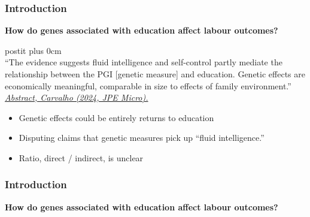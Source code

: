 \documentclass[dvipsnames,handout]{beamer} %
\renewcommand{\raggedright}{\leftskip=0pt \rightskip=0pt plus 0cm}
\begin{document}
\begin{frame}[noframenumbering]
    \frametitle{Introduction}
    \textbf{How do genes associated with education affect labour outcomes?}
    \vspace{0.25cm}
    
    \begin{beamercolorbox}{postit}
        \raggedright
        \vspace{0.01cm} \\
        ``The evidence suggests fluid intelligence and self-control partly mediate the relationship between the PGI [genetic measure] and education.
        Genetic effects are economically meaningful, comparable in size to effects of family environment.''
        \hfill
        \underline{\textit{Abstract, Carvalho (2024, JPE Micro).}}
        \vspace{0.02cm}
    \end{beamercolorbox}

    \vspace{-0.25cm}
    \begin{figure}
        \centering
        \singlespacing
    \end{figure}
    \vspace{-0.25cm}
    \begin{itemize}
        \item Genetic effects could be entirely returns to education
        \item Disputing claims that genetic measures pick up ``fluid intelligence.''
        \item Ratio, direct / indirect, is unclear
    \end{itemize}
\end{frame}
\begin{frame}[noframenumbering]
    \frametitle{Introduction}
    \textbf{How do genes associated with education affect labour outcomes?}
    \vspace{0.25cm}
    \tableofcontents
\end{frame}
\end{document}
